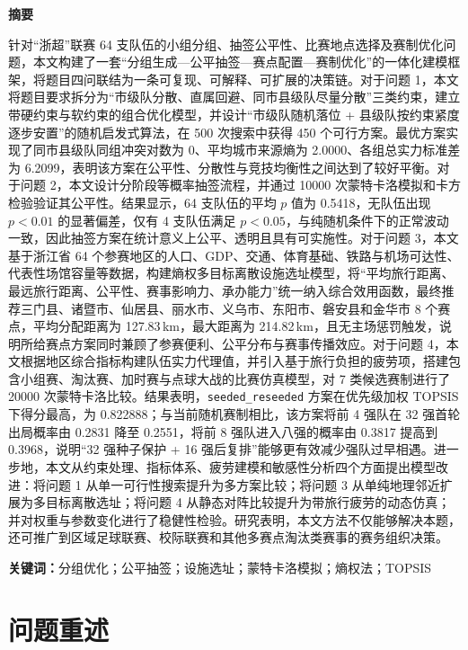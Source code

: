 \documentclass[UTF8,a4paper,12pt]{ctexart}
\begin{document}
\setcounter{page}{1}
\begin{center}
{\bfseries 摘要}
\end{center}

针对“浙超”联赛 64 支队伍的小组分组、抽签公平性、比赛地点选择及赛制优化问题，本文构建了一套“分组生成—公平抽签—赛点配置—赛制优化”的一体化建模框架，将题目四问联结为一条可复现、可解释、可扩展的决策链。对于问题 1，本文将题目要求拆分为“市级队分散、直属回避、同市县级队尽量分散”三类约束，建立带硬约束与软约束的组合优化模型，并设计“市级队随机落位 + 县级队按约束紧度逐步安置”的随机启发式算法，在 500 次搜索中获得 450 个可行方案。最优方案实现了同市县级队同组冲突对数为 0、平均城市来源熵为 2.0000、各组总实力标准差为 6.2099，表明该方案在公平性、分散性与竞技均衡性之间达到了较好平衡。对于问题 2，本文设计分阶段等概率抽签流程，并通过 10000 次蒙特卡洛模拟和卡方检验验证其公平性。结果显示，64 支队伍的平均 $p$ 值为 0.5418，无队伍出现 $p < 0.01$ 的显著偏差，仅有 4 支队伍满足 $p < 0.05$，与纯随机条件下的正常波动一致，因此抽签方案在统计意义上公平、透明且具有可实施性。对于问题 3，本文基于浙江省 64 个参赛地区的人口、GDP、交通、体育基础、铁路与机场可达性、代表性场馆容量等数据，构建熵权多目标离散设施选址模型，将“平均旅行距离、最远旅行距离、公平性、赛事影响力、承办能力”统一纳入综合效用函数，最终推荐三门县、诸暨市、仙居县、丽水市、义乌市、东阳市、磐安县和金华市 8 个赛点，平均分配距离为 127.83\,km，最大距离为 214.82\,km，且无主场惩罚触发，说明所给赛点方案同时兼顾了参赛便利、公平分布与赛事传播效应。对于问题 4，本文根据地区综合指标构建队伍实力代理值，并引入基于旅行负担的疲劳项，搭建包含小组赛、淘汰赛、加时赛与点球大战的比赛仿真模型，对 7 类候选赛制进行了 20000 次蒙特卡洛比较。结果表明，\texttt{seeded\_reseeded} 方案在优先级加权 TOPSIS 下得分最高，为 0.822888；与当前随机赛制相比，该方案将前 4 强队在 32 强首轮出局概率由 0.2831 降至 0.2551，将前 8 强队进入八强的概率由 0.3817 提高到 0.3968，说明“32 强种子保护 + 16 强后复排”能够更有效减少强队过早相遇。进一步地，本文从约束处理、指标体系、疲劳建模和敏感性分析四个方面提出模型改进：将问题 1 从单一可行性搜索提升为多方案比较；将问题 3 从单纯地理邻近扩展为多目标离散选址；将问题 4 从静态对阵比较提升为带旅行疲劳的动态仿真；并对权重与参数变化进行了稳健性检验。研究表明，本文方法不仅能够解决本题，还可推广到区域足球联赛、校际联赛和其他多赛点淘汰类赛事的赛务组织决策。

\vspace{0.8em}
\noindent\textbf{关键词：}分组优化；公平抽签；设施选址；蒙特卡洛模拟；熵权法；TOPSIS

\clearpage

\section{问题重述}
\end{document}
